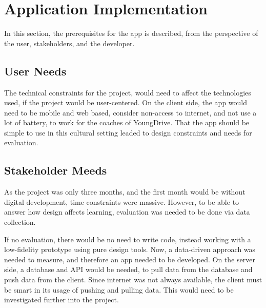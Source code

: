 \section{Application Implementation}

In this section, the prerequisites for the app is described, from the perspective of the user, stakeholders, and the developer.

\subsection{User Needs}

The technical constraints for the project, would need to affect the technologies used, if the project would be user-centered. On the client side, the app would need to be mobile and web based, consider non-access to internet, and not use a lot of battery, to work for the coaches of YoungDrive. That the app should be simple to use in this cultural setting leaded to design constraints and needs for evaluation.

\subsection{Stakeholder Meeds}

As the project was only three months, and the first month would be without digital development, time constraints were massive. However, to be able to answer how design affects learning, evaluation was needed to be done via data collection.

If no evaluation, there would be no need to write code, instead working with a low-fidelity prototype using pure design tools. Now, a data-driven approach was needed to measure, and therefore an app needed to be developed. On the server side, a database and API would be needed, to pull data from the database and push data from the client. Since internet was not always available, the client must be smart in its usage of pushing and pulling data. This would need to be investigated further into the project.









